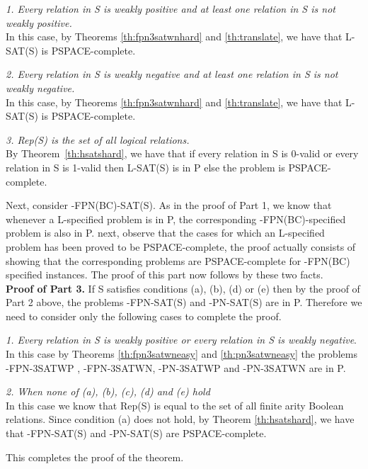 \noindent
{\em 1.  Every relation in {\sf S} is weakly positive and at least one relation
in {\sf S} is not weakly positive.}\\
In this case, by Theorems \ref{th:fpn3satwnhard} and \ref{th:translate}, 
we have that {\sf L-SAT(S)} is {\sf PSPACE}-complete.

\noindent
{\em 2. Every relation in {\sf S} is weakly negative and at least one relation
in {\sf S} is not weakly negative.}\\
In this case, by Theorems \ref{th:fpn3satwnhard} and \ref{th:translate}, 
we have that {\sf L-SAT(S)} is
{\sf PSPACE}-complete.

\noindent
{\em  3. {\sf Rep(S)}  is the set of all logical relations.}\\
By Theorem~\ref{th:hsatshard}, we have that if 
every relation in {\sf S} is 0-valid or every relation 
in {\sf S} is 1-valid then {\sf L-SAT(S)} is in {\sf P}
else the problem is {\sf PSPACE}-complete.



Next, consider {-FPN(BC)-SAT(S)}. 
As in the proof of Part 1, we know that whenever a {\sf L}-specified
problem is in {\sf P}, 
the corresponding {-FPN(BC)}-specified problem is also in {\sf P}.
next, observe that the cases for which an {\sf L}-specified problem has been
proved to be {\sf PSPACE}-complete, the proof actually consists of showing that
the corresponding problems are {\sf PSPACE}-complete for {-FPN(BC)} 
specified instances. The proof of this part now follows by these two facts.\\


\noindent
{\bf Proof of Part 3.}
If {\sf S} satisfies conditions (a), (b), (d) or (e) then 
by the proof of Part 2 above, the problems
{-FPN-SAT(S)} and {-PN-SAT(S)} are in {\sf P}. 
Therefore we need to consider only the following cases to complete the proof.


\noindent
{\em 1. Every relation in {\sf S} is weakly positive or every relation in
{\sf S} is weakly negative}.\\
In this case by Theorems \ref{th:fpn3satwneasy} and \ref{th:pn3satwneasy}
the problems {-FPN-3SATWP} , {-FPN-3SATWN}, {-PN-3SATWP}  and
{-PN-3SATWN}  are in {\sf P}.

\noindent
{\em 2. When none of (a), (b), (c), (d) and (e) hold}\\
In this case we know that {\sf Rep(S)} is equal to the set
of all finite arity Boolean relations. Since condition (a) does not hold,
by Theorem \ref{th:hsatshard}, we have that 
{-FPN-SAT(S)} and {-PN-SAT(S)} are {\sf PSPACE}-complete.

This completes the proof of the theorem. \hfill\QED
